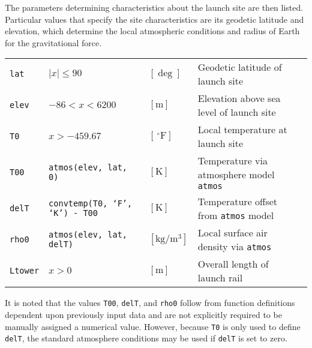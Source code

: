 \documentclass[11pt]{thesis}
\numberwithin{equation}{section}
\begin{document}
The parameters determining characteristics about the launch site are then listed. Particular values that specify the site characteristics are its geodetic latitude and elevation, which determine the local atmospheric conditions and radius of Earth for the gravitational force.
\begin{longtable}[l]{l l l l l}
\texttt{lat} & $|x| \leq 90$ & $[\si{\deg}]$ & Geodetic latitude of launch site \\
\texttt{elev} & $-86 < x < 6200$ & $[\si{\m}]$ & Elevation above sea level of launch site \\
\texttt{T0} & $x > -459.67$ & $[\,\!^\circ \mathrm{F}]$ & Local temperature at launch site \\
\texttt{T00} & \texttt{atmos(elev, lat, 0)} & $[\si{\K}]$ & Temperature via atmosphere model \texttt{atmos} \\
\texttt{delT} & \texttt{convtemp(T0, `F', `K') - T00} & $[\si{\K}]$ & Temperature offset from \texttt{atmos} model \\
\texttt{rho0} & \texttt{atmos(elev, lat, delT)} & $[\si{\kg/\m\cubed}]$ & Local surface air density via \texttt{atmos} \\
\texttt{Ltower} & $x > 0$ & $[\si{\m}]$ & Overall length of launch rail
\end{longtable}
It is noted that the values \texttt{T00}, \texttt{delT}, and \texttt{rho0} follow from function definitions dependent upon previously input data and are not explicitly required to be manually assigned a numerical value. However, because \texttt{T0} is only used to define \texttt{delT}, the standard atmosphere conditions may be used if \texttt{delT} is set to zero.
\end{document}
